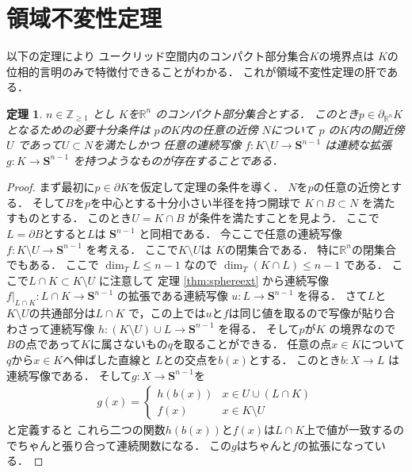 \documentclass[leqno, a4paper, 12pt]{jsarticle}
\newtheorem{thm}{定理}
\newcommand{\zz}{\mathbb{Z}}
\newcommand{\rr}{\mathbb{R}}
\newcommand{\mysphere}[1]{\mathbf{S}^{#1}}
\numberwithin{equation}{section}
\begin{document}
\section{領域不変性定理}

以下の定理により
ユークリッド空間内のコンパクト部分集合$K$の境界点は
$K$の位相的言明のみで特徴付できることがわかる．
これが領域不変性定理の肝である．
\begin{thm}\label{thm:26junbidaiji}
$n\in \zz_{\ge 1}$
とし
$K$を$\rr^{n}$
のコンパクト部分集合とする．
このとき$p\in \partial_{\rr^{n}} K$
となるための必要十分条件は
$p$の$K$内の任意の近傍
$N$について
$p$
の$K$内の開近傍$U$
であって$U\subset N$を満たしかつ
任意の連続写像
$f\colon K\setminus U\to \mysphere{n-1}$
は連続な拡張$g\colon K\to \mysphere{n-1}$
を持つようなものが存在することである．
\end{thm}
\begin{proof}
まず最初に$p\in \partial K$を仮定して定理の条件を導く．
$N$を$p$の任意の近傍とする．
そして$B$を$p$を中心とする十分小さい半径を持つ開球で
$K\cap B\subset N$
を満たすものとする．
このとき$U=K\cap B$
が条件を満たすことを見よう．
ここで$L=\partial B$とすると$L$は
$\mysphere{n-1}$
と同相である．
今ここで任意の連続写像
$f\colon K\setminus U\to \mysphere{n-1}$
を考える．
ここで$K\setminus U$は
$K$の閉集合である．
特に$\rr^{n}$の閉集合でもある．
ここで
$\dim_{T}L\le n-1$
なので
$\dim_{T}(K\cap L)\le n-1$
である．
ここで$L\cap K\subset K\setminus U$
に注意して
定理
\ref{thm:sphereext}
から連続写像
$f|_{L\cap K}\colon L\cap K\to \mysphere{n-1}$
の拡張である連続写像
$u\colon L\to \mysphere{n-1}$
を得る．
さて$L$と$K\setminus U$の共通部分は$L\cap K$
で，この上では$u$と$f$は同じ値を取るので写像が貼り合わさって連続写像
$h\colon (K\setminus U)\cup L\to \mysphere{n-1}$
を得る．
そして$p$が$K$
の境界なので
$B$の点であって$K$に属さないもの$q$を取ることができる．
任意の点$x\in K$について
$q$から$x\in K$へ伸ばした直線と
$L$との交点を$b(x)$とする．
このとき$b\colon X\to L$
は連続写像である．
そして$g\colon X\to \mysphere{n-1}$を
\begin{align*}
g(x)
=
\begin{cases}
h(b(x)) & \text{$x\in U\cup (L\cap K)$}\\
f(x) & \text{$x\in K\setminus U$}
\end{cases}
\end{align*}
と定義すると
これら二つの関数$h(b(x))$と$f(x)$は$L\cap K$上で値が一致するのでちゃんと張り合って連続関数になる．
この$g$はちゃんと$f$の拡張になっている．


\end{proof}
\end{document}
